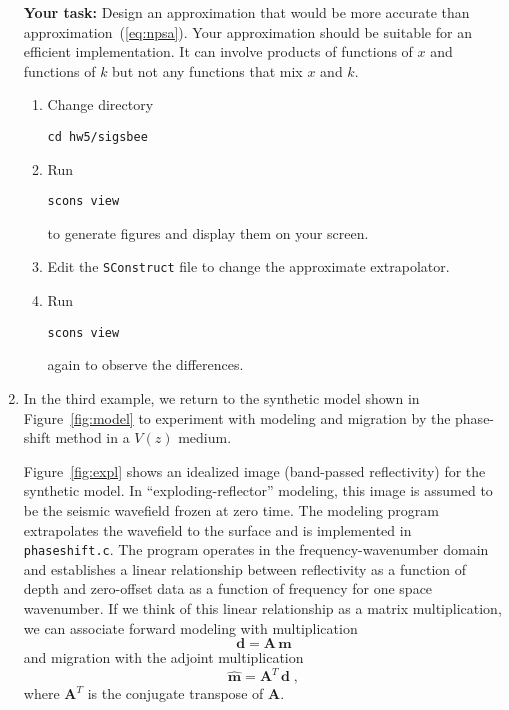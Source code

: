 \begin{enumerate}
  \textbf{Your task:} Design an approximation that would be more accurate
  than approximation~(\ref{eq:npsa}). Your approximation should be
  suitable for an efficient implementation. It can involve products of functions
  of $x$  and functions
  of $k$ but not any functions that mix $x$ and $k$. 
    \begin{enumerate}
    \item Change directory 
\begin{verbatim}
cd hw5/sigsbee
\end{verbatim}
    \item Run
\begin{verbatim}
scons view
\end{verbatim}
      to generate figures and display them on your screen.  
    \item Edit the \texttt{SConstruct} file to change the approximate extrapolator.
    \item Run
\begin{verbatim}
scons view
\end{verbatim}
      again to observe the differences.
    \end{enumerate}




\lstset{language=python,numbers=left,numberstyle=\tiny,showstringspaces=false}


\item In the third example, we return to the synthetic model shown in Figure~\ref{fig:model} to experiment with  modeling and migration by the phase-shift method in a $V(z)$ medium. 

Figure~\ref{fig:expl} shows an idealized image (band-passed
reflectivity) for the synthetic model. In ``exploding-reflector''
modeling, this image is assumed to be the seismic wavefield frozen at
zero time. The modeling program extrapolates the wavefield to the
surface and is implemented in \texttt{phaseshift.c}. The program
operates in the frequency-wavenumber domain and establishes a linear
relationship between reflectivity as a function of depth and
zero-offset data as a function of frequency for one space wavenumber.
If we think of this linear relationship as a matrix multiplication, we
can associate forward modeling with multiplication
\begin{equation}
\label{eq:mod}
\mathbf{d} = \mathbf{A}\,\mathbf{m}
\end{equation}
and migration with the adjoint multiplication
\begin{equation}
\label{eq:mig}
\widehat{\mathbf{m}} = \mathbf{A}^T\,\mathbf{d}\;,
\end{equation}
where $\mathbf{A}^T$ is the conjugate transpose of $\mathbf{A}$.


\end{enumerate}
